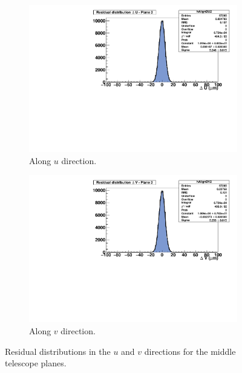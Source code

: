       \begin{figure}[!h]
        \centering
        \begin{subfigure}[t]{0.45\textwidth}
          \centering
          \includegraphics[width = 1.2\textwidth]{Pictures/deformation/residualUPl2_226056.pdf}
          \caption{Along $u$ direction.}
          \label{fig:alignmentPlane2}
        \end{subfigure}
        \hfill
        \begin{subfigure}[t]{0.45\textwidth}
          \centering
          \includegraphics[width = 1.2\textwidth]{Pictures/deformation/residualVPl2_226056.pdf}
          \caption{Along $v$ direction.}
          \label{fig:alignmentPlane3}
        \end{subfigure}
        \caption{Residual distributions in the $u$ and $v$ directions for the middle telescope planes.}
        \label{fig:alignmentTelescope}
      \end{figure}

